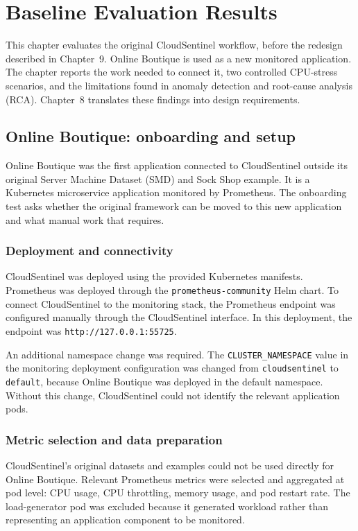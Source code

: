 \chapter{Baseline Evaluation Results}
\label{ch:baseline_evaluation_results}
This chapter evaluates the original CloudSentinel workflow, before the redesign described in Chapter~9. Online Boutique is used as a new monitored application. The chapter reports the work needed to connect it, two controlled CPU-stress scenarios, and the limitations found in anomaly detection and root-cause analysis (RCA). Chapter~8 translates these findings into design requirements.

\section{Online Boutique: onboarding and setup}
Online Boutique was the first application connected to CloudSentinel outside its original Server Machine Dataset (SMD) and Sock Shop example. It is a Kubernetes microservice application monitored by Prometheus. The onboarding test asks whether the original framework can be moved to this new application and what manual work that requires.

\subsection{Deployment and connectivity}
CloudSentinel was deployed using the provided Kubernetes manifests. Prometheus was deployed through the \texttt{prometheus-community} Helm chart. To connect CloudSentinel to the monitoring stack, the Prometheus endpoint was configured manually through the CloudSentinel interface. In this deployment, the endpoint was \texttt{http://127.0.0.1:55725}.

An additional namespace change was required. The \texttt{CLUSTER\_NAMESPACE} value in the monitoring deployment configuration was changed from \texttt{cloudsentinel} to \texttt{default}, because Online Boutique was deployed in the default namespace. Without this change, CloudSentinel could not identify the relevant application pods.

\subsection{Metric selection and data preparation}
CloudSentinel's original datasets and examples could not be used directly for Online Boutique. Relevant Prometheus metrics were selected and aggregated at pod level: CPU usage, CPU throttling, memory usage, and pod restart rate. The load-generator pod was excluded because it generated workload rather than representing an application component to be monitored.

